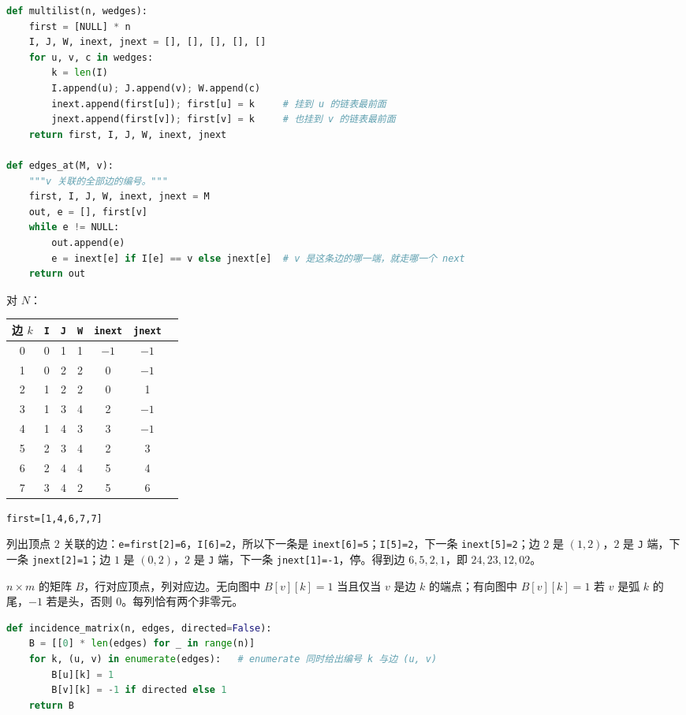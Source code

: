 \begin{lstlisting}[language=Python]
def multilist(n, wedges):
    first = [NULL] * n
    I, J, W, inext, jnext = [], [], [], [], []
    for u, v, c in wedges:
        k = len(I)
        I.append(u); J.append(v); W.append(c)
        inext.append(first[u]); first[u] = k     # 挂到 u 的链表最前面
        jnext.append(first[v]); first[v] = k     # 也挂到 v 的链表最前面
    return first, I, J, W, inext, jnext

def edges_at(M, v):
    """v 关联的全部边的编号。"""
    first, I, J, W, inext, jnext = M
    out, e = [], first[v]
    while e != NULL:
        out.append(e)
        e = inext[e] if I[e] == v else jnext[e]  # v 是这条边的哪一端，就走哪一个 next
    return out
\end{lstlisting}

对 $N$：

\begin{center}
\begin{tabular}{ccccccc}
\toprule
边 $k$ & \texttt{I} & \texttt{J} & \texttt{W} & \texttt{inext} & \texttt{jnext} \\
\midrule
0 & 0 & 1 & 1 & $-1$ & $-1$ \\
1 & 0 & 2 & 2 & 0 & $-1$ \\
2 & 1 & 2 & 2 & 0 & 1 \\
3 & 1 & 3 & 4 & 2 & $-1$ \\
4 & 1 & 4 & 3 & 3 & $-1$ \\
5 & 2 & 3 & 4 & 2 & 3 \\
6 & 2 & 4 & 4 & 5 & 4 \\
7 & 3 & 4 & 2 & 5 & 6 \\
\bottomrule
\end{tabular}
\qquad \texttt{first=[1,4,6,7,7]}
\end{center}

列出顶点 $2$ 关联的边：\texttt{e=first[2]=6}，\texttt{I[6]=2}，所以下一条是 \texttt{inext[6]=5}；\texttt{I[5]=2}，下一条 \texttt{inext[5]=2}；边 $2$ 是 $(1,2)$，$2$ 是 \texttt{J} 端，下一条 \texttt{jnext[2]=1}；边 $1$ 是 $(0,2)$，$2$ 是 \texttt{J} 端，下一条 \texttt{jnext[1]=-1}，停。得到边 $6,5,2,1$，即 $24,23,12,02$。


$n\times m$ 的矩阵 $B$，行对应顶点，列对应边。无向图中 $B[v][k]=1$ 当且仅当 $v$ 是边 $k$ 的端点；有向图中 $B[v][k]=1$ 若 $v$ 是弧 $k$ 的尾，$-1$ 若是头，否则 $0$。每列恰有两个非零元。

\begin{lstlisting}[language=Python]
def incidence_matrix(n, edges, directed=False):
    B = [[0] * len(edges) for _ in range(n)]
    for k, (u, v) in enumerate(edges):   # enumerate 同时给出编号 k 与边 (u, v)
        B[u][k] = 1
        B[v][k] = -1 if directed else 1
    return B
\end{lstlisting}

